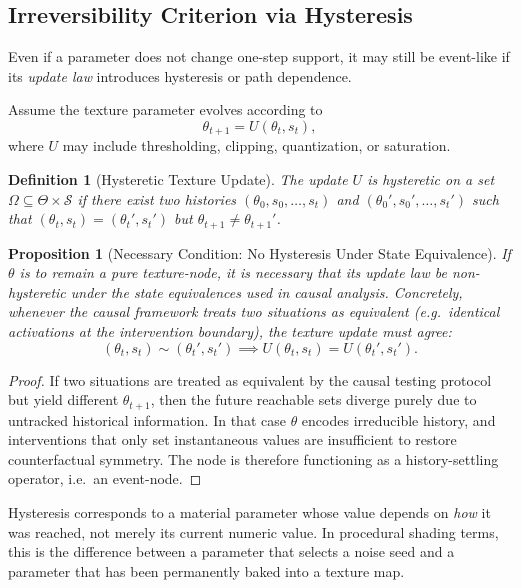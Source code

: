 \documentclass[11pt]{article}
\newtheorem{definition}{Definition}
\newtheorem{proposition}{Proposition}
\newcommand{\State}{\mathcal{S}}
\begin{document}
\subsection{Irreversibility Criterion via Hysteresis}

Even if a parameter does not change one-step support, it may still be
event-like if its \emph{update law} introduces hysteresis or path dependence.

Assume the texture parameter evolves according to
\begin{equation}
\theta_{t+1} = U(\theta_t, s_t),
\end{equation}
where $U$ may include thresholding, clipping, quantization, or saturation.

\begin{definition}[Hysteretic Texture Update]
The update $U$ is \emph{hysteretic} on a set $\Omega \subseteq \Theta \times \State$
if there exist two histories $(\theta_0,s_0,\dots,s_t)$ and
$(\theta_0',s_0',\dots,s_t')$ such that $(\theta_t,s_t)=(\theta_t',s_t')$ but
$\theta_{t+1} \neq \theta_{t+1}'$.
\end{definition}

\begin{proposition}[Necessary Condition: No Hysteresis Under State Equivalence]
If $\theta$ is to remain a pure texture-node, it is necessary that its update
law be \emph{non-hysteretic} under the state equivalences used in causal
analysis. Concretely, whenever the causal framework treats two situations as
equivalent (e.g.\ identical activations at the intervention boundary), the
texture update must agree:
\begin{equation}
(\theta_t,s_t) \sim (\theta_t',s_t') \implies U(\theta_t,s_t)=U(\theta_t',s_t').
\end{equation}
\end{proposition}

\begin{proof}
If two situations are treated as equivalent by the causal testing protocol but
yield different $\theta_{t+1}$, then the future reachable sets diverge purely
due to untracked historical information. In that case $\theta$ encodes
irreducible history, and interventions that only set instantaneous values are
insufficient to restore counterfactual symmetry. The node is therefore
functioning as a history-settling operator, i.e.\ an event-node.
\end{proof}

Hysteresis corresponds to a material parameter whose value depends on
\emph{how} it was reached, not merely its current numeric value. In procedural
shading terms, this is the difference between a parameter that selects a noise
seed and a parameter that has been permanently baked into a texture map.
\end{document}

